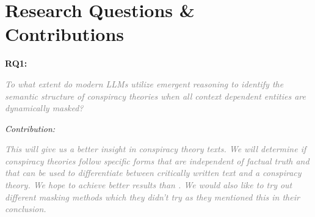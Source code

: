 \documentclass[11pt, a4paper]{article}
\newif\ifinstructions
\newcommand{\explain}[1]{%
  \ifinstructions
    \par\vspace{2pt}%
    {\small\color{exgray} #1}%
    \par\vspace{2pt}%
  \fi
}
\newcommand{\example}[1]{%
  \ifinstructions
    \par\vspace{1pt}%
    {\small\color{exblue} #1}%
    \par\vspace{4pt}%
  \fi
}
\newcommand{\fillhere}[1]{%
  \par\vspace{2pt}%
  \textit{\textcolor{gray}{#1}}%
  \par\vspace{2pt}%
}
\begin{document}
{%
\section{Research Questions \& Contributions}

\explain{List your research questions (RQs). An RQ is a question your study will answer --- what will it add to our knowledge compared to related work? Good RQs start with: ``What is the relationship between\ldots'', ``What are the factors that affect\ldots'', ``What types of X exist\ldots'' (exploratory), ``How to do X\ldots'' (engineering). Avoid ``Can X do Y?'' unless you are confident it can, or will provide strong theoretical or empirical evidence that it cannot.}

\explain{For each RQ, list your planned \textbf{contributions} --- the tangible, reusable results your study will produce. A contribution can be a framework, a dataset, a model, a thorough analysis, or a research agenda. You will typically have 1--3 contributions.}

\example{``To enable the study of cross-lingual transfer in low-resource Slavic languages, this paper addresses three research questions and makes the following contributions:

\textbf{RQ1:} How well does zero-shot cross-lingual transfer from XLM-R generalize to low-resource Slavic languages on NER?\\
\textit{Contribution:} We report a systematic evaluation across seven languages and three domains, providing the most comprehensive picture to date of transfer performance in this setting.
More efficient.

\textbf{RQ2:} What linguistic factors predict transfer success or failure?\\
\textit{Contribution:} We introduce a diagnostic framework that correlates model errors with morphological complexity, script type, and training data size.

\textbf{RQ3:} How to improve transfer for the lowest-resource languages?\\
\textit{Contribution:} We propose and evaluate a lightweight adaptation strategy using automatically translated pivot data. Our results will pave the path for more inclusive multilingual NLP benchmarking.''}

\noindent\textbf{RQ1:} 
\fillhere{
  To what extent do modern LLMs utilize emergent reasoning to identify the semantic structure of conspiracy theories when all context dependent entities are dynamically masked?}
\textit{Contribution:}
\fillhere{This will give us a better insight in conspiracy theory texts. We will
determine if conspiracy theories follow specific forms that are independent of
factual truth and that can be used to differentiate between critically written
text and a conspiracy theory. We hope to achieve better results than \citep{fort2023bigfoot}.
We would also like to try out different masking methods which they didn't try as they mentioned
this in their conclusion.}

}
\end{document}
